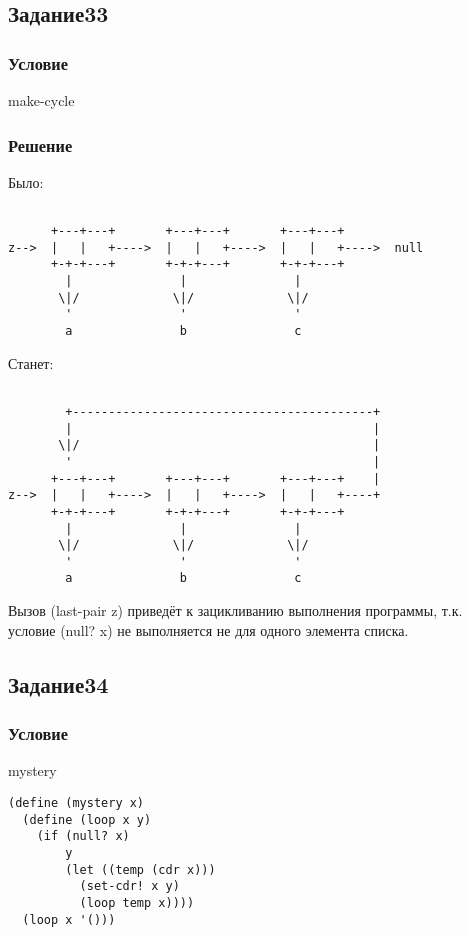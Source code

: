 \documentclass[10pt,a4paper]{article}
\begin{document}
\lstset{ %
basicstyle=\footnotesize,       %
frame=none
}


\subsection*{Задание33}
\subsubsection*{Условие}
make-cycle
\subsubsection*{Решение}

Было:
\begin{lstlisting}

      +---+---+       +---+---+       +---+---+
z-->  |   |   +---->  |   |   +---->  |   |   +---->  null
      +-+-+---+       +-+-+---+       +-+-+---+
        |               |               |
       \|/             \|/             \|/
        '               '               '
        a               b               c

\end{lstlisting}

Станет:\newpage
\begin{lstlisting}

        +------------------------------------------+
        |                                          |
       \|/                                         |
        '                                          |
      +---+---+       +---+---+       +---+---+    |
z-->  |   |   +---->  |   |   +---->  |   |   +----+
      +-+-+---+       +-+-+---+       +-+-+---+
        |               |               |
       \|/             \|/             \|/
        '               '               '
        a               b               c

\end{lstlisting}

Вызов (last-pair z) приведёт к зацикливанию выполнения программы,
т.к. условие (null? x) не выполняется не для одного элемента списка.

\subsection*{Задание34}
\subsubsection*{Условие}
mystery
\begin{lstlisting}
(define (mystery x)
  (define (loop x y)
    (if (null? x)
        y
        (let ((temp (cdr x)))
          (set-cdr! x y)
          (loop temp x))))
  (loop x '()))
\end{lstlisting}
\end{document}

